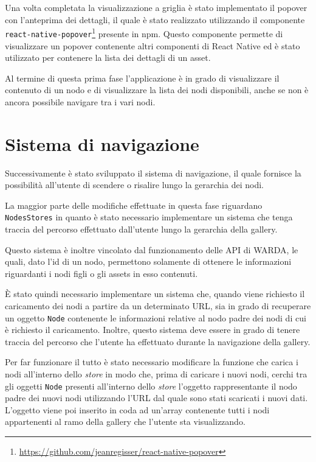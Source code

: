 Una volta completata la visualizzazione a griglia è stato implementato il popover con l'anteprima dei dettagli, il quale è stato realizzato utilizzando il componente \texttt{react-native-popover}\footnote{\url{https://github.com/jeanregisser/react-native-popover}} presente in npm. 
Questo componente permette di visualizzare un popover contenente altri componenti di React Native ed è stato utilizzato per contenere la lista dei dettagli di un asset.

Al termine di questa prima fase l'applicazione è in grado di visualizzare il contenuto di un nodo e di visualizzare la lista dei nodi disponibili, anche se non è ancora possibile navigare tra i vari nodi.

\section{Sistema di navigazione}

Successivamente è stato sviluppato il sistema di navigazione, il quale fornisce la possibilità all'utente di scendere o risalire lungo la gerarchia dei nodi.

La maggior parte delle modifiche effettuate in questa fase riguardano \texttt{NodesStores} in quanto è stato necessario implementare un sistema che tenga traccia del percorso effettuato dall'utente lungo la gerarchia della gallery.

Questo sistema è inoltre vincolato dal funzionamento delle API di WARDA, le quali, dato l'id di un nodo, permettono solamente di ottenere le informazioni riguardanti i nodi figli o gli assets in esso contenuti.

\`E stato quindi necessario implementare un sistema che, quando viene richiesto il caricamento dei nodi a partire da un determinato URL, sia in grado di recuperare un oggetto \texttt{Node} contenente le informazioni relative al nodo padre dei nodi di cui è richiesto il caricamento.
Inoltre, questo sistema deve essere in grado di tenere traccia del percorso che l'utente ha effettuato durante la navigazione della gallery.

Per far funzionare il tutto è stato necessario modificare la funzione che carica i nodi all'interno dello \textit{store} in modo che, prima di caricare i nuovi nodi, cerchi tra gli oggetti \texttt{Node} presenti all'interno dello \textit{store} l'oggetto rappresentante il nodo padre dei nuovi nodi utilizzando l'URL dal quale sono stati scaricati i nuovi dati.
L'oggetto viene poi inserito in coda ad un'array contenente tutti i nodi appartenenti al ramo della gallery che l'utente sta visualizzando.

